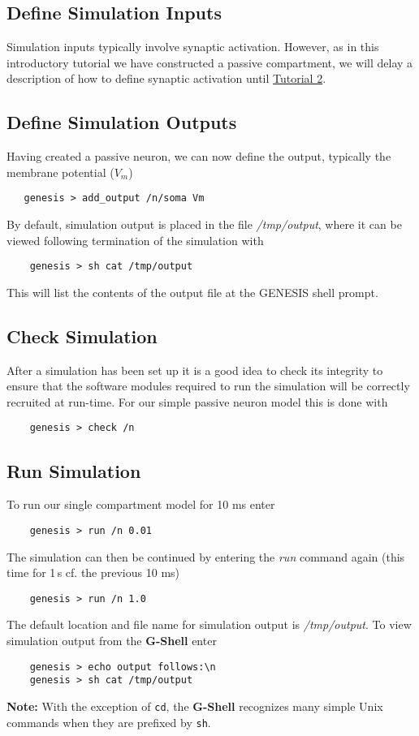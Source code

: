 \documentclass[12pt]{article}
\begin{document}
\subsection*{Define Simulation Inputs}

Simulation inputs typically involve synaptic activation. However, as in this introductory tutorial we have constructed a passive compartment, we will delay a description of how to define synaptic activation until \href{../tutorial2/tutorial2.tex}{Tutorial 2}.  

\subsection*{Define Simulation Outputs}

Having created a passive neuron, we can now define the output, typically the membrane potential ($V_m$)
\begin{verbatim}
   genesis > add_output /n/soma Vm
\end{verbatim}
By default, simulation output is placed in the file {\it /tmp/output}, where it can be viewed following termination of the simulation with
\begin{verbatim}
    genesis > sh cat /tmp/output
\end{verbatim}
This will list the contents of the output file at the GENESIS shell prompt.

\subsection*{Check Simulation}

After a simulation has been set up it is a good idea to check its integrity to ensure that the software modules required to run the simulation will be correctly recruited at run-time. For our simple passive neuron model this is done with 
\begin{verbatim}
    genesis > check /n
\end{verbatim}

\subsection*{Run Simulation}

To run our single compartment model for 10 ms enter
\begin{verbatim}
    genesis > run /n 0.01
\end{verbatim}
The simulation can then be continued by entering the {\it run} command again (this time for 1\,s cf. the previous 10 ms)
\begin{verbatim}
    genesis > run /n 1.0
\end{verbatim}
The default location and file name for simulation output is {\it /tmp/output}. To view simulation output from the {\bf G-Shell} enter
\begin{verbatim}
    genesis > echo output follows:\n
    genesis > sh cat /tmp/output
\end{verbatim}
{\bf Note:} With the exception of {\tt cd}, the {\bf G-Shell} recognizes many simple Unix commands when they are prefixed by {\tt sh}.
    
\end{document}
